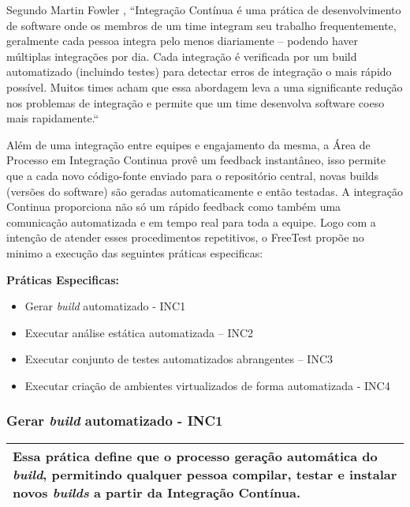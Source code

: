 Segundo Martin Fowler \cite{Beck2001}, “Integração Contínua é uma prática de desenvolvimento de software onde os membros de um time integram seu trabalho frequentemente, geralmente cada pessoa integra pelo menos diariamente – podendo haver múltiplas integrações por dia. Cada integração é verificada por um build automatizado (incluindo testes) para detectar erros de integração o mais rápido possível. Muitos times acham que essa abordagem leva a uma significante redução nos problemas de integração e permite que um time desenvolva software coeso mais rapidamente.“

Além de uma integração entre equipes e engajamento da mesma, a Área de Processo em Integração Continua provê um feedback instantâneo, isso permite que a cada novo código-fonte enviado para o repositório central, novas builds (versões do software) são geradas automaticamente e então testadas. A integração Continua proporciona não só um rápido feedback como também uma comunicação automatizada e em tempo real para toda a equipe. Logo com a intenção de atender esses procedimentos repetitivos, o FreeTest propõe no minimo a execução das seguintes práticas especificas:

\textbf{Práticas Especificas:}

\begin{itemize}    
    \item Gerar \textit{build} automatizado - INC1
    \item Executar análise estática automatizada – INC2
    \item Executar conjunto de testes automatizados abrangentes – INC3
    \item Executar criação de ambientes virtualizados de forma automatizada - INC4
\end{itemize}

\subsubsection{Gerar \textit{build} automatizado - INC1}
\label{sec:inc1}

\begin{table}[!ht]
\centering
\begin{tabular}{|p{130mm}|}
\hline
Essa prática define que o processo geração automática do \textit{build}, permitindo qualquer pessoa compilar, testar e instalar novos \textit{builds} a partir da Integração Contínua. \\
\hline
\end{tabular}
\end{table}

